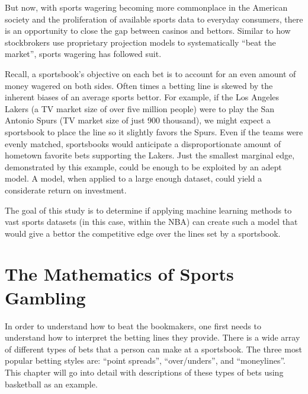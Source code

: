 \documentclass [MS] {uclathes}
\begin{document}
But now, with sports wagering becoming more commonplace in the American society and the proliferation of available sports data to everyday consumers, there is an opportunity to close the gap between casinos and bettors. Similar to how stockbrokers use proprietary projection models to systematically ``beat the market'', sports wagering has followed suit. 

Recall, a sportsbook's objective on each bet is to account for an even amount of money wagered on both sides. Often times a betting line is skewed by the inherent biases of an average sports bettor. For example, if the Los Angeles Lakers (a TV market size of over five million people) were to play the San Antonio Spurs (TV market size of just 900 thousand), we might expect a sportsbook to place the line so it slightly favors the Spurs. Even if the teams were evenly matched, sportsbooks would anticipate a disproportionate amount of hometown favorite bets supporting the Lakers. Just the smallest marginal edge, demonstrated by this example, could be enough to be exploited by an adept model. A model, when applied to a large enough dataset, could yield a considerate return on investment. 

The goal of this study is to determine if applying machine learning methods to vast sports datasets (in this case, within the NBA) can create such a model that would give a bettor the competitive edge over the lines set by a sportsbook. 


\chapter{The Mathematics of Sports Gambling}

In order to understand how to beat the bookmakers, one first needs to understand how to interpret the betting lines they provide. There is a wide array of different types of bets that a person can make at a sportsbook. The three most popular betting styles are: ``point spreads'', ``over/unders'', and ``moneylines''. This chapter will go into detail with descriptions of these types of bets using basketball as an example.
\end{document}
